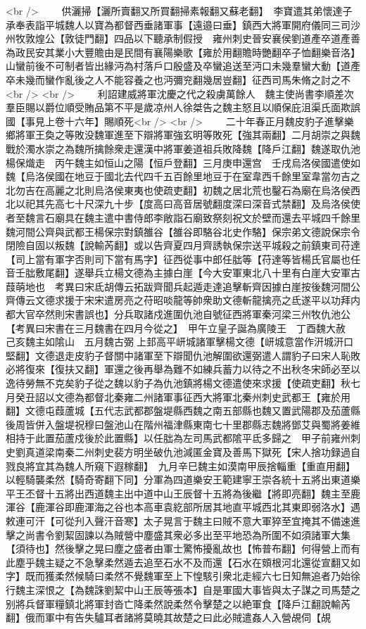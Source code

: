 <br />
　　供灑掃【灑所賣翻又所買翻掃素報翻又蘇老翻】　李寶遣其弟懷達子承奉表詣平城魏人以寶為都督西垂諸軍事【遠邉曰垂】鎮西大將軍開府儀同三司沙州牧敦煌公【敦徒門翻】四品以下聽承制假授　雍州刺史晉安襄侯劉道產卒道產善為政民安其業小大豐贍由是民間有襄陽樂歌【雍於用翻贍時艷翻卒子恤翻樂音洛】山蠻前後不可制者皆出緣沔為村落戶口殷盛及卒蠻追送至沔口未幾羣蠻大動【道產卒未幾而蠻作亂後之人不能容養之也沔彌兖翻幾居豈翻】征西司馬朱脩之討之不<br />
<br />
　　利詔建威將軍沈慶之代之殺虜萬餘人　魏主使尚書李順差次羣臣賜以爵位順受賄品第不平是歲凉州人徐桀告之魏主怒且以順保庇沮渠氏面欺誤國【事見上卷十六年】賜順死<br />
<br />
　　二十年春正月魏皮豹子進擊樂鄉將軍王奐之等敗没魏軍進至下辯將軍強玄明等敗死【強其兩翻】二月胡崇之與魏戰於濁水崇之為魏所擒餘衆走還漢中將軍姜道祖兵敗降魏【降戶江翻】魏遂取仇池楊保熾走　丙午魏主如恒山之陽【恒戶登翻】三月庚申還宫　壬戌烏洛侯國遣使如魏【烏洛侯國在地豆于國北去代四千五百餘里地豆于在室韋西千餘里室韋當勿吉之北勿吉在高麗之北則烏洛侯東夷也使疏吏翻】初魏之居北荒也鑿石為廟在烏洛侯西北以祀其先高七十尺深九十步【度高曰高音居號翻度深曰深音式禁翻】及烏洛侯使者至魏言石廟具在魏主遣中書侍郎李敞詣石廟致祭刻祝文於壁而還去平城四千餘里　魏河間公齊與武都王楊保宗對鎮雒谷【雒谷即駱谷北史作駱】保宗弟文德說保宗令閉險自固以叛魏【說輸芮翻】或以告齊夏四月齊誘執保宗送平城殺之前鎮東司苻達【司上當有軍字否則司下當有馬字】征西從事中郎任朏等【苻達等皆楊氏官屬也任音壬朏敷尾翻】遂舉兵立楊文德為主據白崖【今大安軍東北八十里有白崖大安軍古葭萌地也　考異曰宋氐胡傳云拓跋齊聞兵起遁走達追擊斬齊因據白崖按後魏河間公齊傳云文德求援于宋宋遣房亮之苻昭啖龍等帥衆助文德斬龍擒亮之氐遂平以功拜内都大官卒然則宋書誤也】分兵取諸戍進圍仇池自號征西將軍秦河梁三州牧仇池公　【考異曰宋書在三月魏書在四月今從之】　甲午立皇子誕為廣陵王　丁酉魏大赦　己亥魏主如隂山　五月魏古弼上邽高平岍城諸軍擊楊文德【岍城意當作汧城汧口堅翻】文德退走皮豹子督關中諸軍至下辯聞仇池解圍欲還弼遣人謂豹子曰宋人恥敗必將復來【復扶又翻】軍還之後再舉為難不如練兵蓄力以待之不出秋冬宋師必至以逸待勞無不克矣豹子從之魏以豹子為仇池鎮將楊文德遣使來求援【使疏吏翻】秋七月癸丑詔以文德為都督北秦雍二州諸軍事征西大將軍北秦州刺史武都王【雍於用翻】文德屯葭蘆城【五代志武都郡盤堤縣西魏之南五部縣也魏又置武陽郡及茄蘆縣後周皆併入盤堤祝穆曰盤池山在階州福津縣東南七十里郡縣志魏將鄧艾與蜀將姜維相持于此置茄蘆戍後於此置縣】以任朏為左司馬武都隂平氐多歸之　甲子前雍州刺史劉真道梁南秦二州刺史裴方明坐破仇池減匿金寶及善馬下獄死【宋人捨功録過自戮良將宜其為魏人所窺下遐稼翻】　九月辛巳魏主如漠南甲辰捨輜重【重直用翻】以輕騎襲柔然【騎奇寄翻下同】分軍為四道樂安王範建寧王崇各統十五將出東道樂平王丕督十五將出西道魏主出中道中山王辰督十五將為後繼【將即亮翻】魏主至鹿渾谷【鹿渾谷即鹿渾海之谷也本高車袁紇部所居其地直平城西北其東即弱洛水】遇敕連可汗【可從刋入聲汗音寒】太子晃言于魏主曰賊不意大軍猝至宜掩其不備速進擊之尚書令劉絜固諫以為賊營中塵盛其衆必多出至平地恐為所圍不如須諸軍大集【須待也】然後擊之晃曰塵之盛者由軍士驚怖擾亂故也【怖普布翻】何得營上而有此塵乎魏主疑之不急擊柔然遁去追至石水不及而還【石水在頞根河北還從宣翻又如字】既而獲柔然候騎曰柔然不覺魏軍至上下惶駭引衆北走經六七日知無追者乃始徐行魏主深恨之【為魏誅劉絜中山王辰等張本】自是軍國大事皆與太子謀之司馬楚之别將兵督軍糧鎮北將軍封沓亡降柔然說柔然令擊楚之以絶軍食【降戶江翻說輸芮翻】俄而軍中有告失驢耳者諸將莫曉其故楚之曰此必賊遣姦人入營覘伺【覘